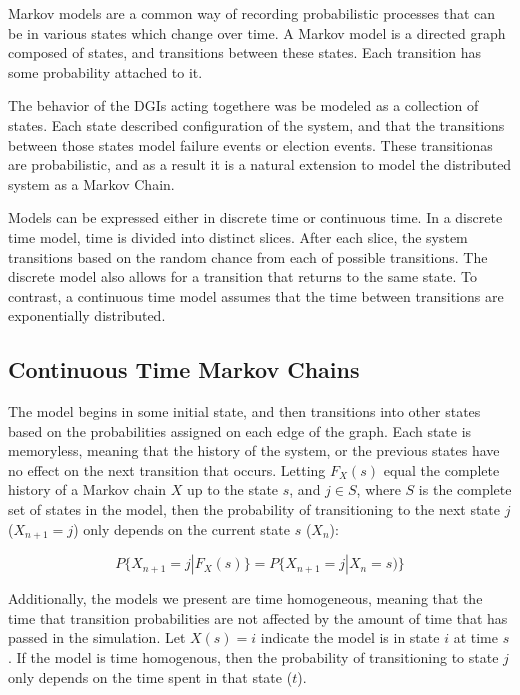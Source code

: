 Markov models are a common way of recording probabilistic processes that can be in various states which change over time.
A Markov model is a directed graph composed of states, and transitions between these states.
Each transition has some probability attached to it.

The behavior of the DGIs acting togethere was be modeled as a collection of states.
Each state described configuration of the system, and that the transitions between those states model failure events or election events.
These transitionas are probabilistic, and as a result it is a natural extension to model the distributed system as a Markov Chain.

Models can be expressed either in discrete time or continuous time.
In a discrete time model, time is divided into distinct slices.
After each slice, the system transitions based on the random chance from each of possible transitions.
The discrete model also allows for a transition that returns to the same state.
To contrast, a continuous time model assumes that the time between transitions are exponentially distributed. 

\subsection{Continuous Time Markov Chains}

The model begins in some initial state, and then transitions into other states based on the probabilities assigned on each edge of the graph.
Each state is memoryless, meaning that the history of the system, or the previous states have no effect on the next transition that occurs.
Letting $F_X(s)$ equal the complete history of a Markov chain $X$ up to the state $s$, and $j \in S$, where $S$ is the complete set of states in the model, then the probability of transitioning to the next state $j$ ($X_{n+1}=j$) only depends on the current state $s$ ($X_{n}$): \cite{MARKOV2} 

\begin{equation}
P\{ X_{n+1}=j | F_{X}(s) \} = P\{ X_{n+1}=j | X_{n} = s) \}
\end{equation}


Additionally, the models we present are time homogeneous, meaning that the time that transition probabilities are not affected by the amount of time that has passed in the simulation.
Let $X(s) = i$ indicate the model is in state $i$ at time $s$.
If the model is time homogenous, then the probability of transitioning to state $j$ only depends on the time spent in that state ($t$).

